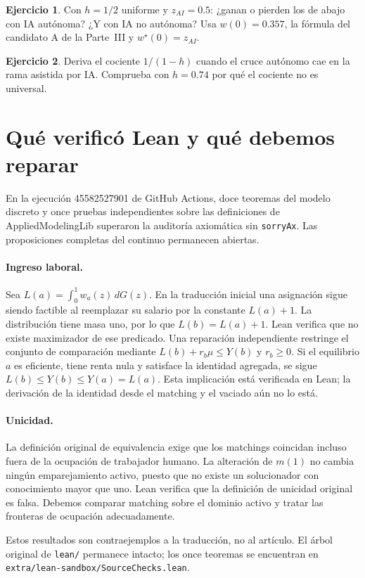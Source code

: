 \documentclass[11pt]{article}
\theoremstyle{definition}
\newtheorem{ejercicio}{Ejercicio}
\theoremstyle{remark}
\newcommand{\zai}{z_{AI}}
\begin{document}
\begin{ejercicio}
Con $h=1/2$ uniforme y $\zai=0.5$: ¿ganan o pierden los de abajo con IA autónoma? ¿Y con IA no autónoma?
Usa $w(0)=0.357$, la fórmula del candidato A de la Parte~III y $w^{\star}(0)=\zai$.
\end{ejercicio}

\begin{ejercicio}
Deriva el cociente $1/(1-h)$ cuando el cruce autónomo cae en la rama asistida por IA.
Comprueba con $h=0.74$ por qué el cociente no es universal.
\end{ejercicio}


\section{Qué verificó Lean y qué debemos reparar}

En la ejecución 45582527901 de GitHub Actions, doce teoremas del modelo discreto y once
pruebas independientes sobre las definiciones de AppliedModelingLib superaron la auditoría
axiomática sin \texttt{sorryAx}. Las proposiciones completas del continuo permanecen abiertas.

\paragraph{Ingreso laboral.} Sea $L(a)=\int_0^1w_a(z)\,dG(z)$. En la traducción inicial
una asignación sigue siendo factible al reemplazar su salario por la constante $L(a)+1$.
La distribución tiene masa uno, por lo que $L(b)=L(a)+1$. Lean verifica que no existe
maximizador de ese predicado. Una reparación independiente restringe el conjunto
de comparación mediante $L(b)+r_b\mu\le Y(b)$ y $r_b\ge0$. Si el equilibrio $a$ es
eficiente, tiene renta nula y satisface la identidad agregada, se sigue
$L(b)\le Y(b)\le Y(a)=L(a)$. Esta implicación está verificada en Lean; la derivación
de la identidad desde el matching y el vaciado aún no lo está.

\paragraph{Unicidad.} La definición original de equivalencia exige que los matchings
coincidan incluso fuera de la ocupación de trabajador humano. La alteración de $m(1)$
no cambia ningún emparejamiento activo, puesto que no existe un solucionador con conocimiento
mayor que uno. Lean verifica que la definición de unicidad original es falsa. Debemos
comparar matching sobre el dominio activo y tratar las fronteras de ocupación adecuadamente.

Estos resultados son contraejemplos a la traducción, no al artículo. El árbol original de
\texttt{lean/} permanece intacto; los once teoremas se encuentran en
\texttt{extra/lean-sandbox/SourceChecks.lean}.
\end{document}
